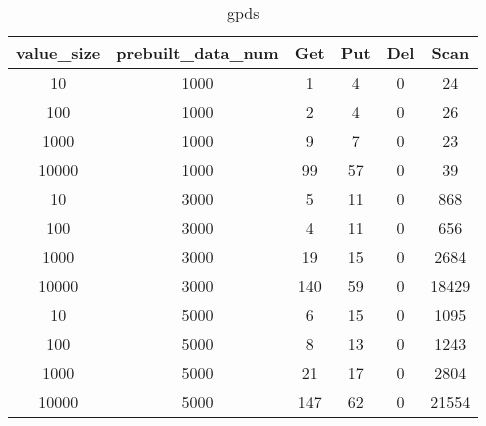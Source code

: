 \begin{table}[H]
\centering
\begin{tabular}{|c|c|c|c|c|c|}
\hline
value_size & prebuilt_data_num & Get & Put & Del & Scan \\
\hline
10 & 1000 & 1 & 4 & 0 & 24 \\
100 & 1000 & 2 & 4 & 0 & 26 \\
1000 & 1000 & 9 & 7 & 0 & 23 \\
10000 & 1000 & 99 & 57 & 0 & 39 \\
10 & 3000 & 5 & 11 & 0 & 868 \\
100 & 3000 & 4 & 11 & 0 & 656 \\
1000 & 3000 & 19 & 15 & 0 & 2684 \\
10000 & 3000 & 140 & 59 & 0 & 18429 \\
10 & 5000 & 6 & 15 & 0 & 1095 \\
100 & 5000 & 8 & 13 & 0 & 1243 \\
1000 & 5000 & 21 & 17 & 0 & 2804 \\
10000 & 5000 & 147 & 62 & 0 & 21554 \\
\hline
\end{tabular}
\caption{gpds}
\end{table}
